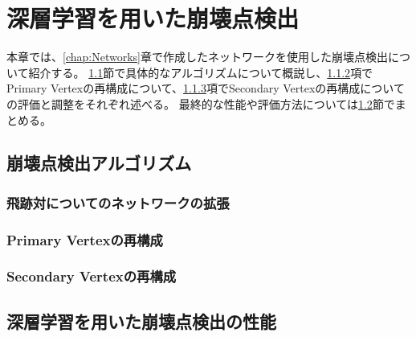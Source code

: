 
\chapter{深層学習を用いた崩壊点検出} \label{chap:VertexFinderwithDL}

本章では、\ref{chap:Networks}章で作成したネットワークを使用した崩壊点検出について紹介する。
\ref{VFDL:AlgorithmforVFDL}節で具体的なアルゴリズムについて概説し、\ref{VFDL:AlgoVFDL:ReconstructionofPrimaryVertex}項でPrimary Vertexの再構成について、\ref{VFDL:AlgoVFDL:ReconstructionofSecondaryVertex}項でSecondary Vertexの再構成についての評価と調整をそれぞれ述べる。
最終的な性能や評価方法については\ref{VFDL:PerformanceofVFDL}節でまとめる。


\section{崩壊点検出アルゴリズム} \label{VFDL:AlgorithmforVFDL}

\subsection{飛跡対についてのネットワークの拡張} \label{VFDL:AlgoVFDL:ReconstructionofPrimaryVertex}

\subsection{Primary Vertexの再構成} \label{VFDL:AlgoVFDL:ReconstructionofPrimaryVertex}

\subsection{Secondary Vertexの再構成} \label{VFDL:AlgoVFDL:ReconstructionofSecondaryVertex}

\section{深層学習を用いた崩壊点検出の性能} \label{VFDL:PerformanceofVFDL}

